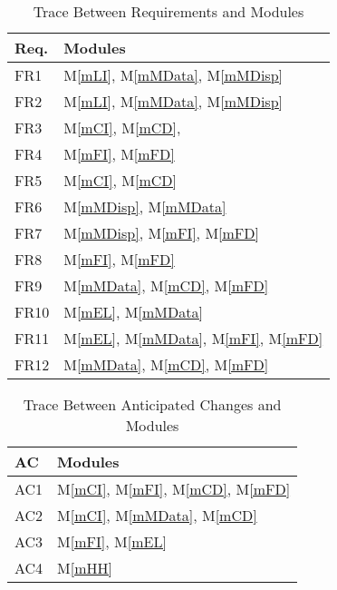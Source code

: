 \documentclass[12pt, titlepage]{article}
\newcommand{\acref}[1]{AC\ref{#1}}
\newcommand{\mref}[1]{M\ref{#1}}
\begin{document}
\begin{table}[H]
\centering
\begin{tabular}{p{} p{}}
\toprule
\textbf{Req.} & \textbf{Modules}\\
\midrule
FR1 & \mref{mLI}, \mref{mMData}, \mref{mMDisp}\\
FR2 & \mref{mLI}, \mref{mMData}, \mref{mMDisp}\\
FR3 & \mref{mCI}, \mref{mCD},\\
FR4 & \mref{mFI}, \mref{mFD}\\
FR5 & \mref{mCI}, \mref{mCD}\\
FR6 & \mref{mMDisp}, \mref{mMData}\\
FR7 & \mref{mMDisp}, \mref{mFI}, \mref{mFD}\\
FR8 & \mref{mFI}, \mref{mFD}\\
FR9 & \mref{mMData}, \mref{mCD}, \mref{mFD}\\
FR10 & \mref{mEL}, \mref{mMData}\\
FR11 & \mref{mEL}, \mref{mMData}, \mref{mFI}, \mref{mFD}\\
FR12 & \mref{mMData}, \mref{mCD}, \mref{mFD}\\
\bottomrule
\end{tabular}
\caption{Trace Between Requirements and Modules}
\label{TblRT}
\end{table}

\begin{table}[H]
\centering
\begin{tabular}{p{} p{}}
\toprule
\textbf{AC} & \textbf{Modules}\\
\midrule
AC1 & \mref{mCI}, \mref{mFI}, \mref{mCD}, \mref{mFD}\\
AC2 & \mref{mCI}, \mref{mMData}, \mref{mCD}\\
AC3 & \mref{mFI}, \mref{mEL}\\
AC4 & \mref{mHH}\\


\bottomrule
\end{tabular}
\caption{Trace Between Anticipated Changes and Modules}
\label{TblACT}
\end{table}
\end{document}
